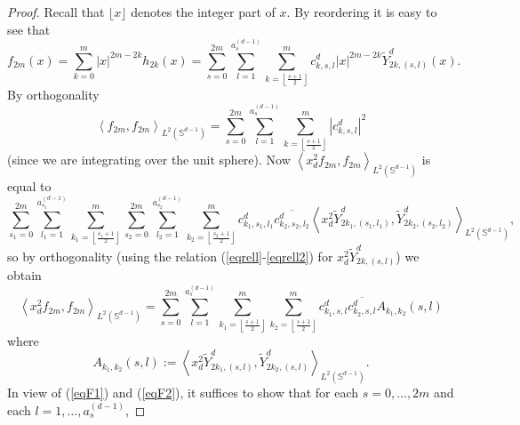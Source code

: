 \documentclass[12pt]{amsart}
\begin{document}
\begin{proof}
Recall that $\lfloor x \rfloor$ denotes the integer part of $x$. By reordering it is easy
to see that 
\begin{equation*}
f_{2m} (x) 
=
\sum_{k=0}^{m} \left\vert x\right\vert
^{2m-2k} h_{2k} (x)
=
\sum_{s=0}^{2m}\sum_{l=1}^{a_{s}^{\left( d-1\right) }}\sum_{k=\left\lfloor
\frac{s+1}{2}\right\rfloor }^{m}c_{k,s,l}^d\left\vert x\right\vert ^{2m-2k}%
\widetilde{Y}_{2k,\left( s,l\right) }^{d}  (x).
\end{equation*}%
By orthogonality 
\begin{equation}
\left\langle f_{2m},f_{2m}\right\rangle _{L^2(\mathbb{S}^{d-1})}=\sum_{s=0}^{2m}%
\sum_{l=1}^{a_{s}^{\left( d-1\right) }}\sum_{k=\left\lfloor \frac{s+1}{2}\right\rfloor
}^{m}\left\vert c_{k,s,l}^d\right\vert ^{2}  \label{eqF1}
\end{equation}
(since we are integrating over the unit sphere).
Now $\left\langle x_{d}^{2}f_{2m},f_{2m}\right\rangle _{L^2(\mathbb{S}^{d-1})}$
is equal to 
\begin{equation*}
\sum_{s_{1}=0}^{2m}\sum_{l_{1}=1}^{a_{s_1}^{\left( d-1\right) }}\sum_{k_{1}= 
\left\lfloor \frac{s_1+1}{2}\right\rfloor }^{m}\sum_{s_{2}=0}^{2m}\sum_{l_{2}=1}^{a_{s_2}^{
\left( d-1\right) }}\sum_{k_{2}=\left\lfloor \frac{s_2+1}{2}\right\rfloor
}^{m}c_{k_{1},s_{1},l_{1}}^d\overline{c_{k_{2},s_{2},l_{2}}^d}\left\langle
x_{d}^{2}\widetilde{Y}^d_{2k_{1},\left( s_{1},l_{1}\right) },\widetilde{Y}^d
_{2k_{2},\left( s_{2},l_{2}\right) }\right\rangle _{L^2(\mathbb{S}^{d-1})},
\end{equation*}
so by orthogonality (using the relation (\ref{eqrell}-\ref{eqrell2}) for $
x_d^2 \widetilde{Y}^d_{2k,\left( s,l\right) }$)
we obtain    
\begin{equation}
\left\langle x_{d}^{2}f_{2m},f_{2m}\right\rangle _{L^2(\mathbb{S}^{d-1})}=\sum_{s=0}^{2m}\sum_{l=1}^{a_{s}^{\left( d-1\right) }}\sum_{k_{1}=
\left\lfloor \frac{s+1}{2}\right\rfloor }^{m}\sum_{k_{2}=\left\lfloor \frac{s+1}{2}\right\rfloor
}^{m}c^d_{k_{1},s,l}\overline{c^d_{k_{2},s,l}}A_{k_{1},k_{2}}\left( s,l\right)
\label{eqF2}
\end{equation}%
where 
\begin{equation*}
A_{k_{1},k_{2}}\left( s,l\right) :=\left\langle x_{d}^{2}\widetilde{Y}^d
_{2k_{1},\left( s,l\right) },\widetilde{Y}^d_{2k_{2},\left( s,l\right)
}\right\rangle_{L^2(\mathbb{S}^{d-1})}.
\end{equation*}
In view of (\ref{eqF1}) and (\ref{eqF2}), it suffices to show that for each $
s=0,\dots , 2m$ and each $l=1,\dots ,a_{s}^{\left( d-1\right) }$,

\end{proof}
\end{document}

